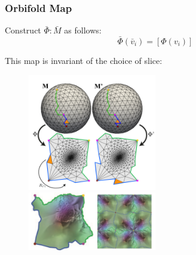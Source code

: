 \documentclass{beamer}
\begin{document}
\begin{frame}
\frametitle{Orbifold Map}
Construct $\bar{\Phi}:\bar{M}$ as follows:
$$\bar{\Phi}(\bar{v}_i) = [\Phi(v_i)]$$

This map is invariant of the choice of slice:
\begin{figure}
\includegraphics[width = 0.5\textwidth]{images/invariant}
\includegraphics[width = 0.5\textwidth]{images/tiling}
\end{figure}
\end{frame}
\end{document}
